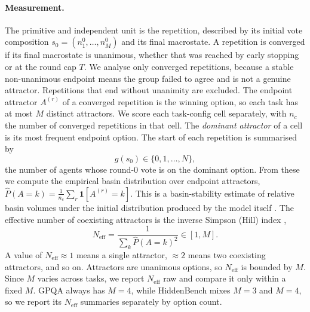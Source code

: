 \paragraph{Measurement.}
The primitive and independent unit is the repetition, described by its initial
vote composition $s_0 = (n_1^0,\ldots,n_M^0)$ and its final macrostate. A
repetition is converged if its final macrostate is unanimous, whether that was
reached by early stopping or at the round cap $T$. We analyse only converged
repetitions, because a stable non-unanimous endpoint means the group failed to
agree and is not a genuine attractor. Repetitions that end without unanimity are
excluded. The endpoint attractor $A^{(r)}$ of a converged repetition is the
winning option, so each task has at most $M$ distinct attractors.
We score each task-config cell separately, with $n_c$ the number of converged
repetitions in that cell. The \emph{dominant attractor} of a cell is its most
frequent endpoint option. The start of each repetition is summarised by
\begin{equation}
  g(s_0) \in \{0, 1, \ldots, N\},
\end{equation}
the number of agents whose round-$0$ vote is on the dominant option.
From these we compute the empirical basin distribution over endpoint attractors,
$\hat{P}(A = k) = \tfrac{1}{n_c}\sum_r \mathbf{1}[A^{(r)} = k]$. This is a
basin-stability estimate of relative basin volumes under the initial
distribution produced by the model itself \citep{menck2013basin}. The effective number of coexisting attractors
is the inverse Simpson (Hill) index \citep{hill1973diversity},
\begin{equation}
  N_{\mathrm{eff}} = \frac{1}{\sum_k \hat{P}(A = k)^2} \in [1, M].
\end{equation}
A value of $N_{\mathrm{eff}} \approx 1$ means a single attractor, $\approx 2$ means
two coexisting attractors, and so on. Attractors are unanimous options, so
$N_{\mathrm{eff}}$ is bounded by $M$. Since $M$ varies across tasks, we report
$N_{\mathrm{eff}}$ raw and compare it only within a fixed $M$. GPQA always has
$M = 4$, while HiddenBench mixes $M = 3$ and $M = 4$, so we report its
$N_{\mathrm{eff}}$ summaries separately by option count.

